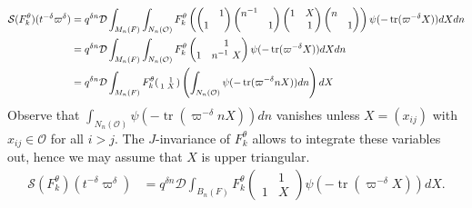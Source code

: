 \documentclass{amsart}
\theoremstyle{definition}
\newcommand{\tr}{\operatorname{tr}}
\newenvironment{spmatrix}{\left(\begin{smallmatrix}}{\end{smallmatrix}\right)}
\begin{document}
{\begin{align*}
\mathcal{S}(F_k^\theta)(t^{-\delta}\varpi^\delta )&=q^{\delta n}\mathcal{D}\int_{M_n(F)}\int_{N_n(\mathcal{O})}F_k^\theta \left(\begin{pmatrix}
&1\\1&\end{pmatrix}\begin{pmatrix}
n^{-1}&\\&1\end{pmatrix}\begin{pmatrix}
1&X\\&1\end{pmatrix}\begin{pmatrix}
n&\\&1\end{pmatrix}\right)\psi(-\tr(\varpi^{-\delta}X))dXdn\\
 &= q^{\delta n}\mathcal{D}\int_{M_n(F)}\int_{N_n(\mathcal{O})}F_k^\theta \begin{pmatrix}&1\\1&n^{-1} X\end{pmatrix}\psi(-\tr(\varpi^{-\delta}X))dXdn\\
  &=q^{\delta n}\mathcal{D}\int_{M_n(F)} F_k^\theta \begin{spmatrix}&1\\1&X\end{spmatrix} \left(\int_{N_n(\mathcal{O})}\psi(-\tr(\varpi^{-\delta} nX))dn\right)dX
\end{align*}
Observe that $\displaystyle \int_{N_n(\mathcal{O})}\psi(-\tr(\varpi^{-\delta}nX))dn$ vanishes unless $X=(x_{ij})$ with $x_{ij}\in \mathcal{O}$ for
all $i>j$. The $J$-invariance of $F_k^\theta$ allows to integrate these variables out, hence we may assume that  $X$ is upper triangular. 
\begin{align*}
\mathcal{S}(F^\theta_k)(t^{-\delta}\varpi^\delta )&=q^{\delta n}\mathcal{D}\int_{B_n(F)} F_k^\theta
                  \begin{pmatrix}&1\\1&X\end{pmatrix}\psi(-\tr(\varpi^{-\delta}X))dX.
\end{align*}

}
\end{document}
